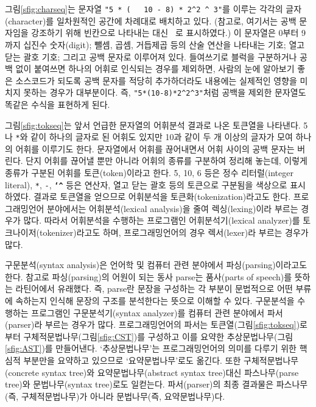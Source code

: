 \documentclass[b5paper,chapter,figtabcapt]{oblivoir}
\begin{document}
그림\;\ref{sfig:charseq}는 문자열
\lstinline[columns=flexible
                   ,keepspaces=true
                   ,showspaces=true]|"5 * (   10 - 8) * 2^2 ^ 3"|를
이루는 각각의 글자(character)를 일차원적인 공간에 차례대로 배치하고 있다.
(참고로, 여기서는 공백 문자임을 강조하기 위해 빈칸으로 나타내는 대신
\lstinline[columns=flexible
                   ,keepspaces=true
                   ,showspaces=true]| |로 표시하였다.)
이 문자열은 0부터 9까지 십진수 숫자(digit); 뺄셈, 곱셈, 거듭제곱 등의
산술 연산을 나타내는 기호; 열고 닫는 괄호 기호; 그리고 공백 문자로
이루어져 있다. 들여쓰기로 블럭을 구분하거나 공백 없이 붙여쓰면 하나의
어휘로 인식되는 경우를 제외하면, 사람의 눈에 알아보기 좋은 소스코드가
되도록 공백 문자를 적당히 추가하더라도 내용에는 실제적인 영향을
미치지 못하는 경우가 대부분이다. 즉,
\lstinline[columns=flexible
                   ,keepspaces=true
                   ,showspaces=true]|"5*(10-8)*2^2^3"|처럼
공백을 제외한 문자열도 똑같은 수식을 표현하게 된다.

그림\;\ref{sfig:tokseq}는 앞서 언급한 문자열의 어휘분석 결과로 나온
토큰열을 나타낸다. 5나 \texttt{*}와 같이 하나의 글자로 된 어휘도 있지만
10과 같이 두 개 이상의 글자가 모여 하나의 어휘를 이루기도 한다.
문자열에서 어휘를 끊어내면서 어휘 사이의 공백 문자는 버린다.
단지 어휘를 끊어낼 뿐만 아니라 어휘의 종류를 구분하여 정리해 놓는데,
이렇게 종류가 구분된 어휘를 토큰(token)이라고 한다.
5, 10, 6 등은 정수 리터럴(integer literal),
\texttt{*}, \texttt{-}, \texttt{\textbf{\char`^}} 등은 연산자,
열고 닫는 괄호 등의 토큰으로 구분됨을 색상으로 표시하였다.
결과로 토큰열을 얻으므로 어휘분석을 토큰화(tokenization)라고도 한다.
프로그래밍언어 분야에서는 어휘분석(lexical analysis)을 줄여
렉싱(lexing)이라 부르는 경우가 많다. 따라서 어휘분석을 수행하는
프로그램인 어휘분석기(lexical analyzer)를 토크나이저(tokenizer)라고도 하며,
프로그래밍언어의 경우 렉서(lexer)라 부르는 경우가 많다.

구문분석(syntax analysis)은 언어학 및 컴퓨터 관련 분야에서
파싱(parsing)이라고도 한다. 참고로 파싱(parsing)의 어원이 되는 동사
parse는 품사(parts of speech)를 뜻하는 라틴어에서 유래했다\cite{MWdict}.
즉, parse란 문장을 구성하는 각 부분이 문법적으로 어떤 부류에
속하는지 인식해 문장의 구조를 분석한다는 뜻으로 이해할 수 있다.
구문분석을 수행하는 프로그램인 구문분석기(syntax analyzer)를
컴퓨터 관련 분야에서 파서(parser)라 부르는 경우가 많다.
프로그래밍언어의 파서는 토큰열(그림\;\ref{sfig:tokseq})로부터
구체적문법나무(그림\;\ref{sfig:CST})를 구성하고 이를 요약한
추상문법나무(그림\;\ref{sfig:AST})를 만들어낸다. `추상문법나무'는
프로그래밍언어의 의미를 다루기 위한 핵심적 부분만을 요약하고 있으므로
`요약문법나무'로도 옮긴다. 또한 구체적문법나무(concrete syntax tree)와
요약문법나무(abstract syntax tree)대신 파스나무(parse tree)와
문법나무(syntax tree)로도 일컫는다. 파서(parser)의 최종 결과물은
파스나무(즉, 구체적문법나무)가 아니라 문법나무(즉, 요약문법나무)다.
\end{document}
